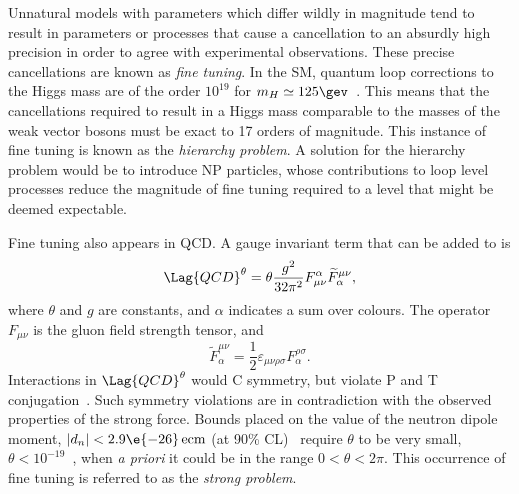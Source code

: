 Unnatural models with parameters which differ wildly in magnitude tend to
result in parameters or processes that cause a cancellation to an absurdly
high precision in order to agree with experimental observations.
These precise cancellations are known as \emph{fine tuning}.
In the SM, quantum loop corrections to the Higgs mass are of the order $10^{19}$
for $m_H\simeq125\gev$~\cite{Chatrchyan:2012ufa,Aad:2012tfa}.
This means that the cancellations required to result in a Higgs mass comparable to the masses of
the weak vector bosons must be exact to 17 orders of magnitude.
This instance of fine tuning is known as the \emph{hierarchy problem}.
A solution for the hierarchy problem would be to introduce NP particles, whose contributions to
loop level processes reduce the magnitude of fine tuning required to a level that might be deemed
expectable.

Fine tuning also appears in QCD.
A gauge invariant term that can be added to  is
\begin{equation}
  \Lag{QCD}^\theta = \theta\frac{g^2}{32\pi^2}
  F_{\mu\nu}^\alpha\widetilde F^{\mu\nu}_\alpha,
  \label{eq:strongcp}
\end{equation}
where $\theta$ and $g$ are constants, and $\alpha$ indicates a sum over colours.
The operator $F_{\mu\nu}$ is the gluon field strength tensor, and
\begin{equation}
  \widetilde F^{\mu\nu}_\alpha = \frac12\varepsilon_{\mu\nu\rho\sigma}F^{\rho\sigma}_\alpha.
\end{equation}
Interactions in $\Lag{QCD}^\theta$ would C symmetry, but violate P and T
conjugation~\cite{Peccei:2006as}.
Such symmetry violations are in contradiction with the observed properties of the strong
force.
Bounds placed on the value of the neutron dipole moment, $|d_n| <2.9\e{-26}\,\mathrm{ecm}$
(at 90\% CL)~\cite{Baker:2006ts} require $\theta$ to be very small,
$\theta<10^{-19}$~\cite{Crewther:PQref9}, when \emph{a priori} it could be in the range
$0<\theta<2\pi$.
This occurrence of fine tuning is referred to as the \emph{strong \CP problem}.

